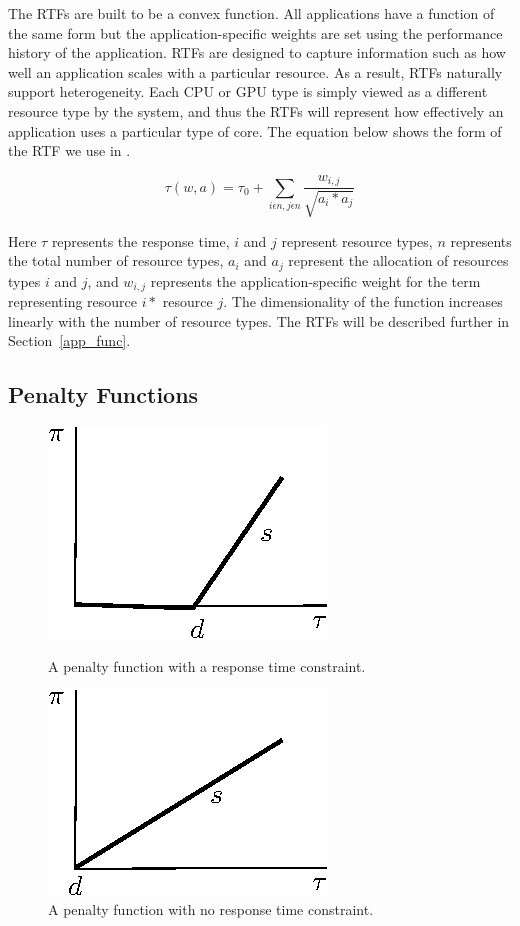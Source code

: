 The RTFs are built to be a convex function.  All applications have a function of the same form but the application-specific weights are set using the performance history of the application.  RTFs are designed to capture information such as how well an application scales with a particular resource. As a result, RTFs naturally support heterogeneity.  Each CPU or GPU type is simply viewed as a different resource type by the system, and thus the RTFs will represent how effectively an application uses a particular type of core. The equation below shows the form of the RTF we use in \pacora. 

\begin{displaymath}
\tau(w,a) = \tau_0 + \sum_{i\epsilon n,j\epsilon n}{\frac{w_{i,j}}{\sqrt{a_i * a_j}}} 
\end{displaymath}

Here $\tau$ represents the response time, $i$ and $j$ represent resource types, $n$ represents the total number of resource types, $a_{i}$ and $a_{j}$ represent the allocation of resources types $i$ and $j$, and $w_{i,j}$ represents the application-specific weight for the term representing resource $i*$ resource $j$.  The dimensionality of the function increases linearly with the number of resource types. The RTFs will be described further in Section~\ref{app_func}.

\subsection*{Penalty Functions}

\begin{figure}[hb]
\parbox{1.6in}{
\includegraphics*{Penalty1.eps}
\caption{\label{f:pen1}A penalty function with a response time constraint.}
}
\hspace{\fill}
\parbox{1.6in}{
\includegraphics*{Penalty2.eps}
\caption{\label{f:pen2}A penalty function with no response time constraint.}
}
\end{figure}

